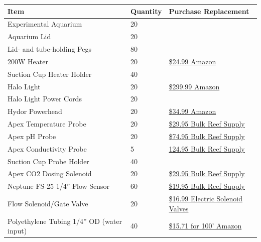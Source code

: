 \documentclass[
]{book}
\begin{document}
\begin{longtable}[]{@{}lll@{}}
\toprule
Item & Quantity & Purchase Replacement \\
\midrule
\endhead
Experimental Aquarium & 20 & \\
Aquarium Lid & 20 & \\
Lid- and tube-holding Pegs & 80 & \\
200W Heater & 20 & \href{https://www.amazon.com/Hydor-Submersible-Glass-Aquarium-Heater/dp/B00061UQ7K}{\$24.99 Amazon} \\
Suction Cup Heater Holder & 40 & \\
Halo Light & 20 & \href{https://www.amazon.com/Aquatic-Life-Halo-Basic-Fixture/dp/B00T6FGDJW}{\$299.99 Amazon} \\
Halo Light Power Cords & 20 & \\
Hydor Powerhead & 20 & \href{https://www.amazon.com/Hydor-Koralia-Nano-Aquarium-Circulation/dp/B0036S70ZG/ref=sr_1_2?keywords=hydor+powerhead\&qid=1572981966\&s=pet-supplies\&sr=1-2}{\$34.99 Amazon} \\
Apex Temperature Probe & 20 & \href{https://www.bulkreefsupply.com/temperature-probe-neptune-systems.html}{\$29.95 Bulk Reef Supply} \\
Apex pH Probe & 20 & \href{https://www.bulkreefsupply.com/lab-grade-double-junction-ph-probe-neptune-systems.html}{\$74.95 Bulk Reef Supply} \\
Apex Conductivity Probe & 5 & \href{https://www.bulkreefsupply.com/neptune-systems-lab-grade-conductivity-probe.html}{124.95 Bulk Reef Supply} \\
Suction Cup Probe Holder & 40 & \\
Apex CO2 Dosing Solenoid & 20 & \href{https://www.bulkreefsupply.com/sv-1-solenoid-valve-neptune-systems.html}{\$29.95 Bulk Reef Supply} \\
Neptune FS-25 1/4'' Flow Sensor & 60 & \href{https://www.bulkreefsupply.com/1-4-flow-sensor-fs25-neptune-systems.html}{\$19.95 Bulk Reef Supply} \\
Flow Solenoid/Gate Valve & 20 & \href{https://www.electricsolenoidvalves.com/1-4-120v-ac-electric-plastic-solenoid-valve/}{\$16.99 Electric Solenoid Valves} \\
Polyethylene Tubing 1/4'' OD (water input) & 40 & \href{https://www.amazon.com/Dixon-0817-Polyethylene-DI087002-Natural/dp/B00LT0T3MG/ref=sr_1_4?crid=ETZJL4UXADQY\&dchild=1\&keywords=polyethylene+tubing+1\%2F4+od\&qid=1590806141\&sprefix=polyethylene+tubing\%2Caps\%2C211\&sr=8-4\#feature-bullets-btf}{\$15.71 for 100' Amazon} \\

\end{longtable}
\end{document}

